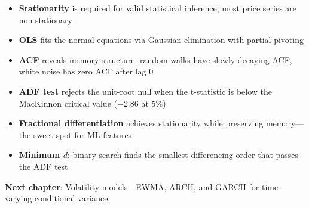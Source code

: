 \begin{itemize}
    \item \textbf{Stationarity} is required for valid statistical inference;
      most price series are non-stationary
    \item \textbf{OLS} fits the normal equations via Gaussian elimination with
      partial pivoting
    \item \textbf{ACF} reveals memory structure: random walks have slowly decaying
      ACF, white noise has zero ACF after lag 0
    \item \textbf{ADF test} rejects the unit-root null when the t-statistic is
      below the MacKinnon critical value ($-2.86$ at 5\%)
    \item \textbf{Fractional differentiation} achieves stationarity while
      preserving memory---the sweet spot for ML features
    \item \textbf{Minimum $d$}: binary search finds the smallest differencing
      order that passes the ADF test
\end{itemize}

\vspace{1em}
\noindent\textbf{Next chapter}: Volatility models---EWMA, ARCH, and GARCH for
time-varying conditional variance.